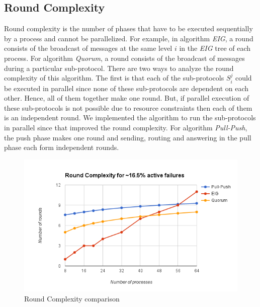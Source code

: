 \subsection{Round Complexity} Round complexity is the number of phases that
have to be executed sequentially by a process and cannot be parallelized. For
example, in algorithm \textit{EIG}, a round consists of the broadcast of
messages at the same level $i$ in the \textit{EIG} tree of each process. For
algorithm \textit{Quorum}, a round consists of the broadcast of messages during
a particular sub-protocol. There are two ways to analyze the round complexity
of this algorithm. The first is that each of the sub-protocols $S_i^j$ could be
executed in parallel since none of these sub-protocols are dependent on each
other. Hence, all of them together make one round. But, if parallel execution
of these sub-protocols is not possible due to resource constraints then each of
them is an independent round. We implemented the algorithm to run the
sub-protocols in parallel since that improved the round complexity. For
algorithm \textit{Pull-Push}, the push phase makes one round and sending,
routing and answering in the pull phase each form independent rounds.

\begin{figure}[ht] \centering 
    \vspace{-2mm}
    \includegraphics[scale=0.4]{Round16}  \caption{Round
    Complexity comparison} \label{fig:round16}  
    \vspace{-6mm}
\end{figure}

